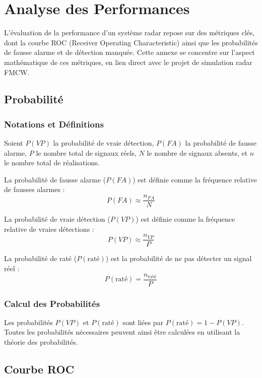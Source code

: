 \chapter{Analyse des Performances}

L'évaluation de la performance d'un système radar repose sur des métriques clés, dont la courbe ROC (Receiver Operating Characteristic) ainsi que les probabilités de fausse alarme et de détection manquée. Cette annexe se concentre sur l'aspect mathématique de ces métriques, en lien direct avec le projet de simulation radar FMCW.

\section{Probabilité}

\subsection{Notations et Définitions}

Soient \( P(VP) \) la probabilité de vraie détection, \( P(FA) \) la probabilité de fausse alarme, \( P \) le nombre total de signaux réels, \( N \) le nombre de signaux absents, et \( n \) le nombre total de réalisations.

La probabilité de fausse alarme (\( P(FA) \)) est définie comme la fréquence relative de fausses alarmes :
\[ P(FA) \approx \frac{n_{FA}}{N} \]

La probabilité de vraie détection (\( P(VP) \)) est définie comme la fréquence relative de vraies détections :
\[ P(VP) \approx \frac{n_{VP}}{P} \]

La probabilité de raté (\( P(\text{raté}) \)) est la probabilité de ne pas détecter un signal réel :
\[ P(\text{raté}) = \frac{n_{\text{raté}}}{P} \]

\subsection{Calcul des Probabilités}

Les probabilités \( P(VP) \) et \( P(\text{raté}) \) sont liées par \( P(\text{raté}) = 1 - P(VP) \). Toutes les probabilités nécessaires peuvent ainsi être calculées en utilisant la théorie des probabilités.

\section{Courbe ROC}

